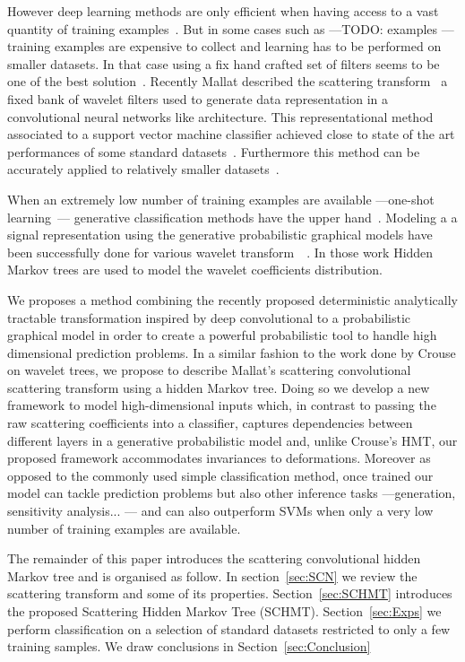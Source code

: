 \documentclass{article}
\begin{document}
  However deep learning methods are only efficient when having access to a vast quantity of training examples~\cite{glorot2010understanding}. But in some cases such as ---TODO: examples --- training examples are expensive to collect and learning has to be performed on smaller datasets. In that case using a fix hand crafted set of filters seems to be one of the best solution~\cite{hsiang2001embedded}. Recently Mallat described the scattering transform~\cite{mallat2012gis} a fixed bank of wavelet filters used to generate data representation in a convolutional neural networks like architecture. This representational method associated to a support vector machine classifier achieved close to state of the art performances of some standard datasets~\cite{bruna2010classification}. Furthermore this method can be accurately applied to relatively smaller datasets~\cite{sifre2013rotation}.
	
  When an extremely low number of training examples are available ---one-shot learning~\cite{fei2006one}--- generative classification methods have the upper hand~\cite{jordan2002discriminative}. Modeling a a signal representation using the generative probabilistic graphical models have been successfully done for various wavelet transform~\cite{crouse1998wavelet}~\cite{kingsbury2001complex}. In those work Hidden Markov trees are used to model the wavelet coefficients distribution.
  
  We proposes a method combining the recently proposed deterministic analytically tractable transformation inspired by deep convolutional to a probabilistic graphical model in order to create a powerful probabilistic tool to handle high dimensional prediction problems. In a similar fashion to the work done by Crouse on wavelet trees, we propose to describe Mallat's scattering convolutional scattering transform using a hidden Markov tree. Doing so we develop a new framework to model high-dimensional inputs which, in contrast to passing the raw scattering coefficients into a classifier, captures dependencies between different layers in a generative probabilistic model and, unlike Crouse's HMT, our proposed framework accommodates invariances to deformations. Moreover as opposed to the commonly used simple classification method, once trained our model can tackle prediction problems but also other inference tasks ---\eg generation, sensitivity analysis... --- and can also outperform SVMs when only a very low number of training examples are available.

  The remainder of this paper introduces the scattering convolutional hidden Markov tree and is organised as follow. In section~\ref{sec:SCN} we review the scattering transform and some of its properties. Section~\ref{sec:SCHMT} introduces the proposed Scattering Hidden Markov Tree (SCHMT). Section~\ref{sec:Exps} we perform classification on a selection of standard datasets restricted to only a few training samples. We draw conclusions in Section~\ref{sec:Conclusion}
\end{document}
